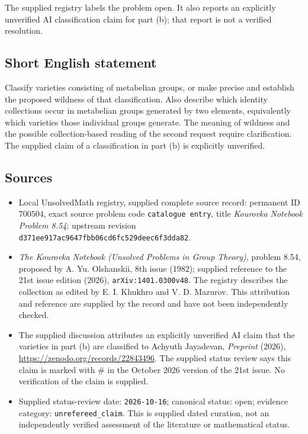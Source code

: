 \documentclass[11pt]{article}
\begin{document}
The supplied registry labels the problem open. It also reports an explicitly unverified AI classification claim for part (b); that report is not a verified resolution.
\subsection{Short English statement}
Classify varieties consisting of metabelian groups, or make precise and establish the proposed wildness of that classification. Also describe which identity collections occur in metabelian groups generated by two elements, equivalently which varieties those individual groups generate. The meaning of wildness and the possible collection-based reading of the second request require clarification. The supplied claim of a classification in part (b) is explicitly unverified.
\subsection{Sources}
\begin{itemize}
\item Local UnsolvedMath registry, supplied complete source record: permanent ID \(700504\), exact source problem code \texttt{catalogue entry}, title \emph{Kourovka Notebook Problem 8.54}; upstream revision \texttt{d371ee917ac9647fbb06cd6fc529deec6f3dda82}.
\item \emph{The Kourovka Notebook (Unsolved Problems in Group Theory)}, problem 8.54, proposed by A. Yu. Olshanskii, 8th issue (1982); supplied reference to the 21st issue edition (2026), \texttt{arXiv:1401.0300v48}. The registry describes the collection as edited by E. I. Khukhro and V. D. Mazurov. This attribution and reference are supplied by the record and have not been independently checked.
\item The supplied discussion attributes an explicitly unverified AI claim that the varieties in part (b) are classified to Achyuth Jayadevan, \emph{Preprint} (2026), \url{https://zenodo.org/records/22843496}. The supplied status review says this claim is marked with \(\#\) in the October 2026 version of the 21st issue. No verification of the claim is supplied.
\item Supplied status-review date: \texttt{2026-10-16}; canonical status: open; evidence category: \texttt{unrefereed\_claim}. This is supplied dated curation, not an independently verified assessment of the literature or mathematical status.
\end{itemize}
\end{document}
